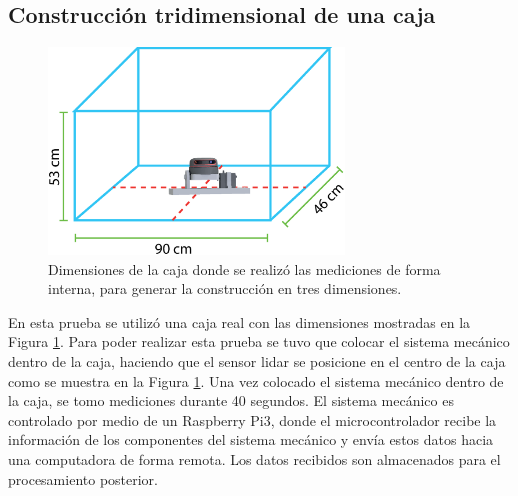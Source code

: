 
\subsection{Construcción tridimensional de una caja}
\label{sec:MapaCaja}
\begin{figure}
  \centering \footnotesize
  \includegraphics[width=0.70\textwidth]{images/cajalidar3d.eps}
  \captionsetup{font=footnotesize}
  \caption{Dimensiones de la caja donde se realizó las mediciones de forma interna, para
  generar la construcción en tres dimensiones.}
  \label{fig:dim_cajaReal}
\end{figure}

En esta prueba se utilizó una caja real con las dimensiones mostradas en 
la Figura \ref{fig:dim_cajaReal}. Para poder realizar esta prueba se tuvo que
colocar el sistema mecánico dentro de la caja, haciendo que el sensor lidar 
se posicione en el centro de la caja como se muestra en la Figura 
\ref{fig:dim_cajaReal}. Una vez colocado el sistema mecánico dentro de la caja, se 
tomo mediciones durante 40 segundos. El sistema mecánico es controlado por
medio de un Raspberry Pi3, donde el microcontrolador recibe la información 
de los componentes del sistema mecánico y envía estos datos hacia una computadora
de forma remota. Los datos recibidos son almacenados para el procesamiento posterior.

